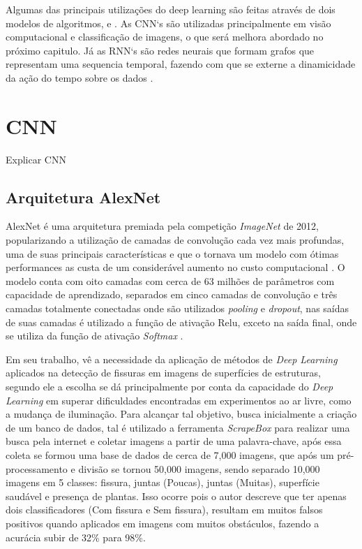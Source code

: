 Algumas das principais utilizações do deep learning são feitas através de dois modelos de algoritmos,  e . As CNN`s são utilizadas principalmente em visão computacional e classificação de imagens, o que será melhora abordado no próximo capitulo. Já as RNN`s são redes neurais que formam grafos que representam uma sequencia temporal, fazendo com que se externe a dinamicidade da ação do tempo sobre os dados \cite{Abiodun2018}.

\section{CNN}

Explicar CNN

\subsection{Arquitetura AlexNet}

AlexNet  \cite{alexnetAnalyticsVidhya2021} é uma arquitetura premiada pela competição \textit{ImageNet} de 2012, popularizando a utilização de camadas de convolução cada vez mais profundas, uma de suas principais características e que o tornava um modelo com ótimas performances as custa de um considerável aumento no custo computacional \cite{krizhevsky2017imagenet}. 
O modelo conta com oito camadas com cerca de 63 milhões de parâmetros com capacidade de aprendizado, separados em cinco camadas de convolução e três camadas totalmente conectadas onde são utilizados \textit{pooling} e \textit{dropout}, nas saídas de suas camadas é utilizado a função de ativação Relu, exceto na saída final, onde se utiliza da função de ativação \textit{Softmax} \cite{alexnetAnalyticsVidhya2021}.

Em seu trabalho,  vê a necessidade da aplicação de métodos de \textit{Deep Learning} aplicados na detecção de fissuras em imagens de superfícies de estruturas, segundo ele a escolha se dá principalmente por conta da capacidade do \textit{Deep Learning} em superar dificuldades encontradas em experimentos ao ar livre, como a mudança de iluminação.
Para alcançar tal objetivo,  busca inicialmente a criação de um banco de dados, tal é utilizado a ferramenta \textit{ScrapeBox} para realizar uma busca pela internet e coletar imagens a partir de uma palavra-chave, após essa coleta se formou uma base de dados de cerca de 7,000 imagens, que após um pré-processamento e divisão se tornou 50,000 imagens, sendo separado 10,000 imagens em 5 classes: fissura, juntas (Poucas), juntas (Muitas), superfície saudável e presença de plantas. Isso ocorre pois o autor descreve que ter apenas dois classificadores (Com fissura e Sem fissura), resultam em muitos falsos positivos quando aplicados em imagens com muitos obstáculos, fazendo a acurácia subir de 32\% para 98\%.

